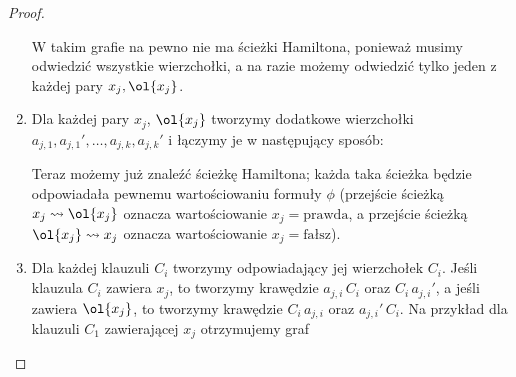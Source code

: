 \begin{proof}
\begin{enumerate}
        W takim grafie na pewno nie ma ścieżki Hamiltona, ponieważ musimy odwiedzić wszystkie wierzchołki, a na razie możemy odwiedzić tylko jeden z każdej pary $x_j, \ol{x_j}$.

        \item Dla każdej pary $x_j$, $\ol{x_j}$ tworzymy dodatkowe wierzchołki $a_{j, 1}, a_{j, 1}', \ldots, a_{j, k}, a_{j, k}'$ i łączymy je w następujący sposób:
        \begin{figure}[H]
            \centering
        \end{figure}

        Teraz możemy już znaleźć ścieżkę Hamiltona; każda taka ścieżka będzie odpowiadała pewnemu wartościowaniu formuły $\phi$ (przejście ścieżką $x_j \rightsquigarrow \ol{x_j}$ oznacza wartościowanie $x_j = \text{prawda}$, a przejście ścieżką $\ol{x_j} \rightsquigarrow x_j$ oznacza wartościowanie $x_j = \text{fałsz}$).

        \item Dla każdej klauzuli $C_i$ tworzymy odpowiadający jej wierzchołek $C_i$. Jeśli klauzula $C_i$ zawiera $x_j$, to tworzymy krawędzie $a_{j, i}\,C_i$ oraz $C_i\,a_{j, i}'$, a jeśli zawiera $\ol{x_j}$, to tworzymy krawędzie $C_i\,a_{j, i}$ oraz $a_{j, i}'\,C_i$. Na przykład dla klauzuli $C_1$ zawierającej $x_j$ otrzymujemy graf
        \begin{figure}[H]
            \centering
\end{figure}
\end{enumerate}
\end{proof}
